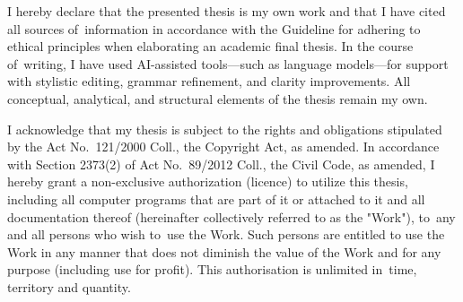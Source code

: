 \documentclass[english,bachelor,oneside]{ctufit-thesis} %
\begin{document}
\begin{declarationpage}
I hereby declare that the presented thesis is my own work and that I have cited all sources of~information in accordance with the Guideline for adhering to ethical principles when elaborating an academic final thesis. 
In the course of~writing, I have used AI-assisted tools—such as language models—for support with stylistic editing, grammar refinement, and clarity improvements. All conceptual, analytical, and structural elements of the thesis remain my own.

I acknowledge that my thesis is subject to the rights and obligations stipulated by the Act No.~121/2000 Coll., the Copyright Act, as amended. In accordance with Section 2373(2) of Act No.~89/2012 Coll., the Civil Code, as amended, I hereby grant a non-exclusive authorization (licence) to utilize this thesis, including all computer programs that are part of it or attached to it and all documentation thereof (hereinafter collectively referred to as the "Work"), to~any and all persons who wish to~use the Work. Such persons are entitled to use the Work in any manner that does not diminish the value of the Work and for any purpose (including use for profit). This authorisation is unlimited in~time, territory and quantity.
\end{declarationpage}

\printabstractpage %

%
%

\tableofcontents %
\end{document}
